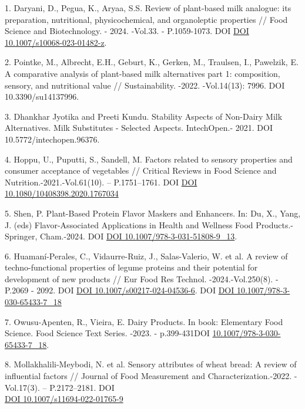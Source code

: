 \begin{references}
1. Daryani, D., Pegua, K., Aryaa, S.S. Review of plant-based milk
analogue: its preparation, nutritional, physicochemical, and
organoleptic properties // Food Science and Biotechnology. - 2024.
-Vol.33. - P.1059-1073. DOI
\href{https://doi.org/10.1007/s10068-023-01482-z}{DOI 10.1007/s10068-023-01482-z}.

2. Pointke, M., Albrecht, E.H., Geburt, K., Gerken, M., Traulsen, I.,
Pawelzik, E. A comparative analysis of plant-based milk alternatives
part 1: composition, sensory, and nutritional value // Sustainability.
-2022. -Vol.14(13): 7996. DOI 10.3390/su14137996.

3. Dhankhar Jyotika and Preeti Kundu. Stability Aspects of Non-Dairy Milk
Alternatives. Milk Substitutes - Selected Aspects. IntechOpen.- 2021.
DOI 10.5772/intechopen.96376.

4. Hoppu, U., Puputti, S., Sandell, M. Factors related to sensory
properties and consumer acceptance of vegetables // Critical Reviews in
Food Science and Nutrition.-2021.-Vol.61(10). -- P.1751--1761. DOI
\href{https://doi.org/10.1080/10408398.2020.1767034}{DOI 10.1080/10408398.2020.1767034}

5. Shen, P. Plant-Based Protein Flavor Maskers and Enhancers. In: Du, X.,
Yang, J. (eds) Flavor-Associated Applications in Health and Wellness
Food Products.-Springer, Cham.-2024. DOI
\href{https://doi.org/10.1007/978-3-031-51808-9_13}{DOI 10.1007/978-3-031-51808-9\_13}.

6. Huamaní-Perales, C., Vidaurre-Ruiz, J., Salas-Valerio, W. et al. A
review of techno-functional properties of legume proteins and their
potential for development of new products // Eur Food Res Technol.
-2024.-Vol.250(8). - P.2069 - 2092. DOI
\href{https://doi.org/10.1007/s00217-024-04536-6}{DOI 10.1007/s00217-024-04536-6}.
DOI \href{http://dx.doi.org/10.1007/978-3-030-65433-7_18}{DOI 10.1007/978-3-030-65433-7\_18}

7. Owusu-Apenten, R., Vieira, E. Dairy Products. In book: Elementary Food
Science. Food Science Text Series. -2023. - p.399-431DOI
\href{https://doi.org/10.1007/978-3-030-65433-7_18}{10.1007/978-3-030-65433-7\_18}.

8. Mollakhalili-Meybodi, N. et al. Sensory attributes of wheat bread: A
review of influential factors // Journal of Food Measurement and
Characterization.-2022. - Vol.17(3). -- P.2172--2181.
DOI \\\href{http://dx.doi.org/10.1007/s11694-022-01765-9}{DOI 10.1007/s11694-022-01765-9}


\end{references}
